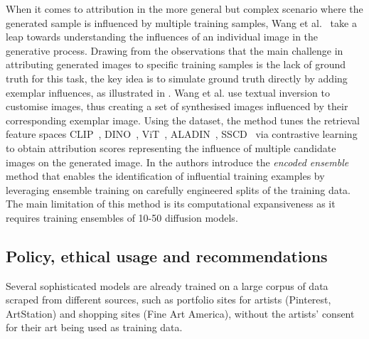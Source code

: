 \documentclass[conference,table]{IEEEtran}
\begin{document}
When it comes to attribution in the more general but complex scenario where the generated sample is influenced by multiple training samples, Wang et al.~\cite{wang_evaluating_2023} take a leap towards understanding the influences of an individual image in the generative process. 
Drawing from the observations that the main challenge in attributing generated images to specific training samples is the lack of ground truth for this task, the key idea is to simulate ground truth directly by adding exemplar influences, as illustrated in .
Wang et al. use textual inversion to customise images, thus creating a set of synthesised images influenced by their corresponding exemplar image. 
Using the dataset, the method tunes the retrieval feature spaces CLIP~\cite{pizzi_self-supervised_2022}, DINO~\cite{caron_emerging_2021}, ViT~\cite{dosovitskiy_image_2021}, ALADIN~\cite{ruta_aladin_2021}, SSCD~\cite{pizzi_self-supervised_2022} via contrastive learning~\cite{oord_representation_2019} to obtain attribution scores representing the influence of multiple candidate images on the generated image.
In \cite{dai_training_2023} the authors introduce the \textit{encoded ensemble} method that enables the identification of influential training examples by leveraging ensemble training on carefully engineered splits of the training data. 
The main limitation of this method is its computational expansiveness as it requires training ensembles of 10-50 diffusion models.

\subsection{Policy, ethical usage and recommendations}\label{sec:mitigation-ethical}
Several sophisticated models are already trained on a large corpus of data scraped from different sources, such as portfolio sites for artists (Pinterest, ArtStation) and shopping sites (Fine Art America), without the artists' consent for their art being used as training data.
\end{document}
